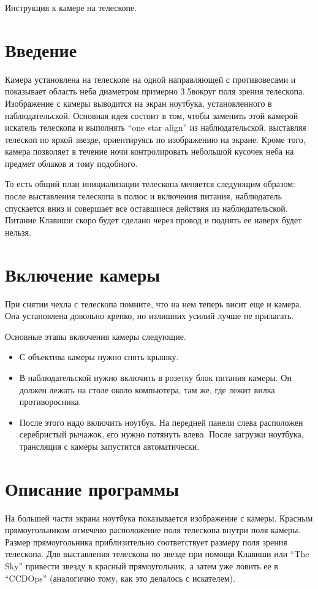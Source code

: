 \message{ !name(skycam_manual.tex)}\documentclass[a4paper,12pt,leqno,notitlepage]{article}
\begin{document}


\begin{center}
  {\Huge Инструкция к камере на телескопе.
}
\end{center}

\section{Введение}
Камера установлена на телескопе на одной направляющей с противовесами и показывает область неба
диаметром примерно 3.5\textdegree вокруг поля зрения телескопа. Изображение с камеры выводится на
экран ноутбука, установленного в наблюдательской. Основная идея состоит в том, чтобы заменить этой
камерой искатель телескопа и выполнять ``one star align'' из наблюдательской, выставляя телескоп
по яркой звезде, ориентируясь по изображению на экране. Кроме того, камера позволяет в течение
ночи контролировать небольшой кусочек неба на предмет облаков и тому подобного.

То есть общий план инициализации телескопа меняется следующим образом: после выставления телескопа
в полюс и включения питания, наблюдатель спускается вниз и совершает все оставшиеся действия из
наблюдательской. Питание Клавиши скоро будет сделано через провод и поднять ее наверх будет нельзя.

\section{Включение камеры}
При снятии чехла с телескопа помните, что на нем теперь висит еще и камера. Она установлена
довольно крепко, но излишних усилий лучше не прилагать.

Основные этапы включения камеры следующие.
\begin{itemize}
\item С объектива камеры нужно снять крышку.
\item В наблюдательской нужно включить в розетку блок питания камеры. Он должен лежать на столе
около компьютера, там же, где лежит вилка противоросника.
\item После этого надо включить ноутбук. На передней панели слева расположен серебристый рычажок, его нужно
потянуть влево. После загрузки ноутбука, трансляция с камеры запустится автоматически.
\end{itemize}

\section{Описание программы}
На большей части экрана ноутбука показывается изображение с камеры. Красным прямоугольником
отмечено расположение поля телескопа внутри поля камеры. Размер прямоугольника приблизительно
соответствует размеру поля зрения телескопа. Для выставления телескопа по звезде при помощи 
Клавиши или ``The Sky'' привести звезду в красный прямоугольник, а затем уже ловить ее в
``CCDOps'' (аналогично тому, как это делалось с искателем).
\end{document}
